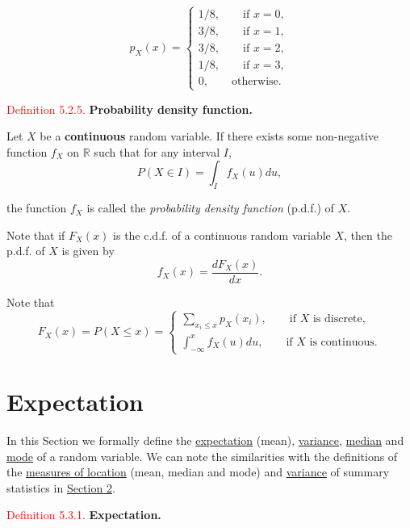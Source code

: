 \documentclass[
]{book}
\begin{document}
\[ p_X(x) = \begin{cases}
1/8, \qquad \text{if $x=0$}, \\
3/8, \qquad \text{if $x=1$}, \\
3/8, \qquad \text{if $x=2$}, \\
1/8, \qquad \text{if $x=3$}, \\
0, \qquad \text{otherwise.}
\end{cases}\]

\leavevmode{}%
\textcolor{red}{Definition 5.2.5.}
{\textbf{Probability density function.}}

Let \(X\) be a \textbf{continuous} random variable. If there exists some non-negative function \(f_X\) on \(\mathbb R\) such that for any interval \(I\),\\

\[P(X \in I) = \int_I f_X(u) du,\]

the function \(f_X\) is called the \emph{probability density function} (p.d.f.) of \(X\).

Note that if \(F_X(x)\) is the c.d.f. of a continuous random variable \(X\), then the p.d.f. of \(X\) is given by
\[f_X(x) = \frac{d F_X(x)}{dx}.\]

Note that\\

\[ F_X(x) = P(X \leq x) = \begin{cases}
\sum\limits_{x_i \leq x} p_X(x_i), \qquad \text{if $X$ is discrete,} \\[9pt]
\int_{-\infty}^x f_X(u)du, \qquad \text{if $X$ is continuous.}
\end{cases} \]

\hypertarget{rv:expect}{%
\section{Expectation}\label{rv:expect}}

In this Section we formally define the \protect\hyperlink{rv:def:expect}{expectation} (mean), \protect\hyperlink{rv:def:variance}{variance}, \protect\hyperlink{rv:def:median}{median} and \protect\hyperlink{rv:def:mode}{mode} of a random variable. We can note the similarities with the definitions of the \protect\hyperlink{summary_location}{measures of location} (mean, median and mode) and \protect\hyperlink{summary_spread}{variance} of summary statistics in \protect\hyperlink{summary}{Section 2}.

\leavevmode{}%
\textcolor{red}{Definition 5.3.1.}
{\textbf{Expectation.}}
\end{document}
